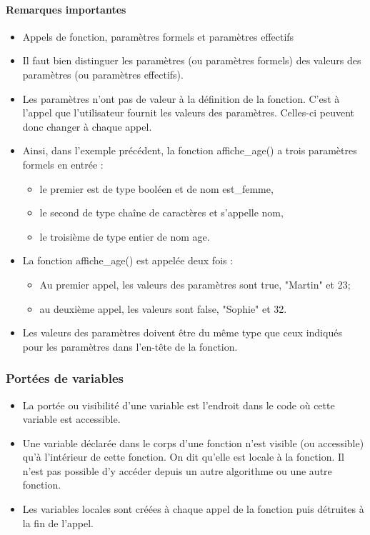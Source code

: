 \documentclass[11pt]{article}
\providecommand{\tightlist}{%
      \setlength{\itemsep}{0pt}\setlength{\parskip}{0pt}}
\begin{document}
    \paragraph{Remarques importantes}\label{remarques-importantes}

\begin{itemize}
\item
  Appels de fonction, paramètres formels et paramètres effectifs
\item
  Il faut bien distinguer les paramètres (ou paramètres formels) des
  valeurs des paramètres (ou paramètres effectifs).
\item
  Les paramètres n'ont pas de valeur à la définition de la fonction.
  C'est à l'appel que l'utilisateur fournit les valeurs des paramètres.
  Celles-ci peuvent donc changer à chaque appel.
\item
  Ainsi, dans l'exemple précédent, la fonction affiche\_age() a trois
  paramètres formels en entrée :

  \begin{itemize}
  \tightlist
  \item
    le premier est de type booléen et de nom est\_femme,
  \item
    le second de type chaîne de caractères et s'appelle nom,
  \item
    le troisième de type entier de nom age.
  \end{itemize}
\item
  La fonction affiche\_age() est appelée deux fois :

  \begin{itemize}
  \tightlist
  \item
    Au premier appel, les valeurs des paramètres sont true, "Martin" et
    23;
  \item
    au deuxième appel, les valeurs sont false, "Sophie" et 32.
  \end{itemize}
\item
  Les valeurs des paramètres doivent être du même type que ceux indiqués
  pour les paramètres dans l'en-tête de la fonction.
\end{itemize}

    \subsubsection{Portées de variables}\label{portuxe9es-de-variables}

\begin{itemize}
\tightlist
\item
  La portée ou visibilité d'une variable est l'endroit dans le code où
  cette variable est accessible.
\item
  Une variable déclarée dans le corps d'une fonction n'est visible (ou
  accessible) qu'à l'intérieur de cette fonction. On dit qu'elle est
  locale à la fonction. Il n'est pas possible d'y accéder depuis un
  autre algorithme ou une autre fonction.
\item
  Les variables locales sont créées à chaque appel de la fonction puis
  détruites à la fin de l'appel.
\end{itemize}
\end{document}
